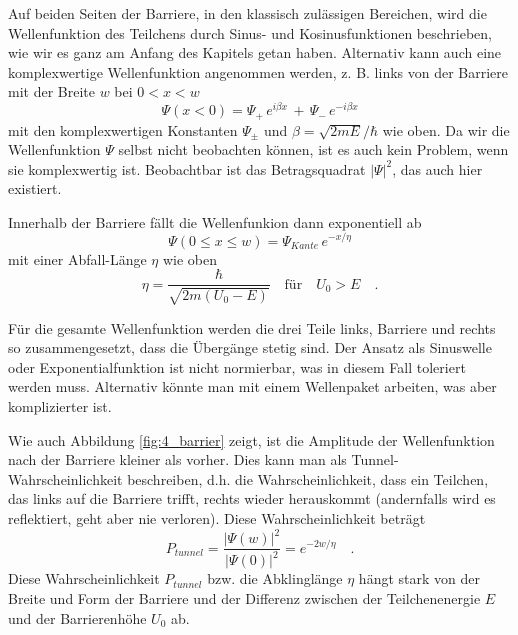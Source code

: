 Auf beiden Seiten der Barriere, in den klassisch zulässigen Bereichen, wird die Wellenfunktion des Teilchens durch Sinus- und Kosinusfunktionen beschrieben, wie wir es ganz am Anfang des Kapitels getan haben. Alternativ kann auch eine komplexwertige Wellenfunktion angenommen werden, z. B. links von der Barriere mit der Breite $w$ bei $0 < x < w$
\begin{equation}
    \Psi(x < 0) = \Psi_{+}\,  e^{i \beta x} \, + \, \Psi_{-} \,e^{-i \beta x}
\end{equation}
mit den komplexwertigen Konstanten $\Psi_\pm$  und $\beta = \sqrt{2 m E }/ \hbar$ wie oben. Da wir die Wellenfunktion $\Psi$ selbst nicht beobachten können, ist es auch kein Problem, wenn sie komplexwertig ist. Beobachtbar ist das Betragsquadrat $|\Psi|^2$, das auch hier existiert.

Innerhalb der Barriere fällt die Wellenfunkion dann exponentiell ab
\begin{equation}
    \Psi(0 \le x \le w) = \Psi_{Kante} \, e^{- x / \eta}
\end{equation}
mit einer Abfall-Länge $\eta$ wie oben 
\begin{equation}
    \eta = \frac{\hbar}{\sqrt{2m ( U_0 - E)}} \quad \text{für} \quad U_0 > E \quad .
\end{equation}

Für die gesamte Wellenfunktion werden die drei Teile links, Barriere und rechts so zusammengesetzt, dass die Übergänge stetig sind.  Der Ansatz als Sinuswelle oder Exponentialfunktion ist nicht normierbar, was in diesem Fall toleriert werden muss. Alternativ könnte man mit einem Wellenpaket arbeiten, was aber komplizierter ist.

Wie auch Abbildung \ref{fig:4_barrier} zeigt, ist die Amplitude der Wellenfunktion nach der Barriere kleiner als vorher. Dies kann man als Tunnel-Wahrscheinlichkeit beschreiben, d.h. die Wahrscheinlichkeit, dass ein Teilchen, das links auf die Barriere trifft, rechts wieder herauskommt (andernfalls wird es reflektiert, geht aber nie verloren). Diese Wahrscheinlichkeit beträgt
\begin{equation}
    P_{tunnel} = \frac{|\Psi(w)|^2} {|\Psi(0)|^2} = e^{-2 w / \eta} \quad .
\end{equation}
Diese Wahrscheinlichkeit $P_{tunnel}$ bzw. die Abklinglänge $\eta$ hängt stark von der Breite und Form der Barriere und der Differenz zwischen der Teilchenenergie $E$ und der Barrierenhöhe $U_0$ ab.

